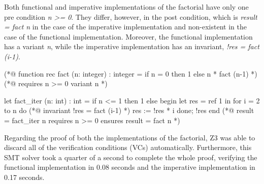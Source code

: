 Both functional and imperative implementations of the factorial have only one pre condition \emph{n >= 0}.
They differ, however, in the post condition, which is \emph{result = fact n} in the case of the imperative implementation and non-existent in the case of the functional implementation.
Moreover, the functional implementation has a variant \emph{n}, while the imperative implementation has an invariant, \emph{!res = fact (i-1)}. 

\bigskip
\newcommand{\provername}[1]{\cellcolor{yellow!25}
\begin{sideways}\textbf{#1}~~\end{sideways}}
\newcommand{\explanation}[1]{\cellcolor{yellow!13}lemma \texttt{#1}}
\newcommand{\transformation}[1]{\cellcolor{yellow!13}transformation \texttt{#1}}
\newcommand{\subgoal}[2]{\cellcolor{yellow!13}subgoal #2}
\newcommand{\valid}[1]{\cellcolor{green!13}#1}
\newcommand{\unknown}[1]{\cellcolor{red!20}#1}
\newcommand{\invalid}[1]{\cellcolor{red!50}#1}
\newcommand{\timeout}[1]{\cellcolor{red!20}(#1)}
\newcommand{\outofmemory}[1]{\cellcolor{red!20}(#1)}
\newcommand{\noresult}{\multicolumn{1}{>{\columncolor[gray]{0.8}}c|}{~}}
\newcommand{\highfailure}{\cellcolor{red!50}FAILURE}
    
\begin{minipage}{\linewidth}
\begin{gospel}
  (*@ function rec fact (n: integer) : integer =
  if n = 0 then 1 else n * fact (n-1) *)
  (*@ requires n >= 0 
    variant n *)
\end{gospel}
\end{minipage}

\begin{minipage}{\linewidth}
\begin{ocamlenv}
  let fact_iter (n: int) : int =
    if n <= 1 then 1
    else
      begin 
        let res = ref 1 in
        for i = 2 to n do
          (*@ invariant !res = fact (i-1) *)
          res := !res * i
        done;
        !res
      end
  (*@ result = fact_iter n
    requires n >= 0 
    ensures result = fact n *)
\end{ocamlenv}
\end{minipage}

Regarding the proof of both the implementations of the factorial, Z3 was able to discard all of the verification conditions (VCs) automatically.
Furthermore, this SMT solver took a quarter of a second to complete the whole proof, verifying the functional implementation in 0.08 seconds and the imperative implementation in 0.17 seconds.

